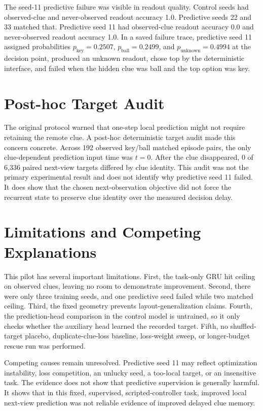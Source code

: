 \documentclass[11pt]{article}
\begin{document}
The seed-11 predictive failure was visible in readout quality. Control seeds had observed-clue and never-observed readout accuracy 1.0. Predictive seeds 22 and 33 matched that. Predictive seed 11 had observed-clue readout accuracy 0.0 and never-observed readout accuracy 1.0. In a saved failure trace, predictive seed 11 assigned probabilities $p_{\mathrm{key}}=0.2507$, $p_{\mathrm{ball}}=0.2499$, and $p_{\mathrm{unknown}}=0.4994$ at the decision point, produced an unknown readout, chose top by the deterministic interface, and failed when the hidden clue was ball and the top option was key.

\section{Post-hoc Target Audit}

The original protocol warned that one-step local prediction might not require retaining the remote clue. A post-hoc deterministic target audit made this concern concrete. Across 192 observed key/ball matched episode pairs, the only clue-dependent prediction input time was $t=0$. After the clue disappeared, 0 of 6,336 paired next-view targets differed by clue identity. This audit was not the primary experimental result and does not identify why predictive seed 11 failed. It does show that the chosen next-observation objective did not force the recurrent state to preserve clue identity over the measured decision delay.

\section{Limitations and Competing Explanations}

This pilot has several important limitations. First, the task-only GRU hit ceiling on observed clues, leaving no room to demonstrate improvement. Second, there were only three training seeds, and one predictive seed failed while two matched ceiling. Third, the fixed geometry prevents layout-generalization claims. Fourth, the prediction-head comparison in the control model is untrained, so it only checks whether the auxiliary head learned the recorded target. Fifth, no shuffled-target placebo, duplicate-clue-loss baseline, loss-weight sweep, or longer-budget rescue run was performed.

Competing causes remain unresolved. Predictive seed 11 may reflect optimization instability, loss competition, an unlucky seed, a too-local target, or an insensitive task. The evidence does not show that predictive supervision is generally harmful. It shows that in this fixed, supervised, scripted-controller task, improved local next-view prediction was not reliable evidence of improved delayed clue memory.
\end{document}
